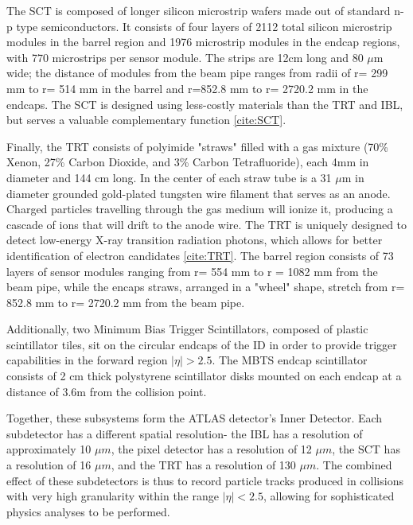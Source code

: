 The SCT is composed of longer silicon microstrip wafers made out of standard n-p type semiconductors. It consists of four layers of 2112 total silicon microstrip modules in the barrel region and 1976 microstrip modules in the endcap regions, with 770 microstrips per sensor module. The strips are 12cm long and 80 $\mu$m wide; the distance of modules from the beam pipe ranges from radii of r= 299 mm to r= 514 mm in the barrel and r=852.8 mm to r= 2720.2 mm in the endcaps. The SCT is designed using less-costly materials than the TRT and IBL, but serves a valuable complementary function \ref{cite:SCT}.

Finally, the TRT consists of polyimide "straws" filled with a gas mixture (70\% Xenon, 27\% Carbon Dioxide, and 3\% Carbon Tetrafluoride), each 4mm in diameter and 144 cm long. In the center of each straw tube is a 31 $\mu$m in diameter grounded gold-plated tungsten wire filament that serves as an anode. Charged particles travelling through the gas medium will ionize it, producing a cascade of ions that will drift to the anode wire. The TRT is uniquely designed to detect low-energy X-ray transition radiation photons, which allows for better identification of electron candidates \ref{cite:TRT}. The barrel region consists of 73 layers of sensor modules ranging from r= 554 mm to r = 1082 mm from the beam pipe, while the encaps straws, arranged in a "wheel" shape, stretch from r= 852.8 mm to r= 2720.2 mm from the beam pipe. 

Additionally, two Minimum Bias Trigger Scintillators, composed of plastic scintillator tiles, sit on the circular endcaps of the ID in order to provide trigger capabilities in the forward region $ |\eta| > 2.5 $. The MBTS endcap scintillator consists of 2 cm thick polystyrene scintillator disks mounted on each endcap at a distance of 3.6m from the collision point. 

Together, these subsystems form the ATLAS detector's Inner Detector. Each subdetector has a different spatial resolution- the IBL has a resolution of  approximately 10 $\mu m$, the pixel detector has a resolution of 12 $\mu m$, the SCT has a resolution of 16 $\mu m$, and the TRT has a resolution of 130 $\mu m$. The combined effect of these subdetectors is thus to record particle tracks produced in collisions with very high granularity within the range $ | \eta | < 2.5$, allowing for sophisticated physics analyses to be performed. 

